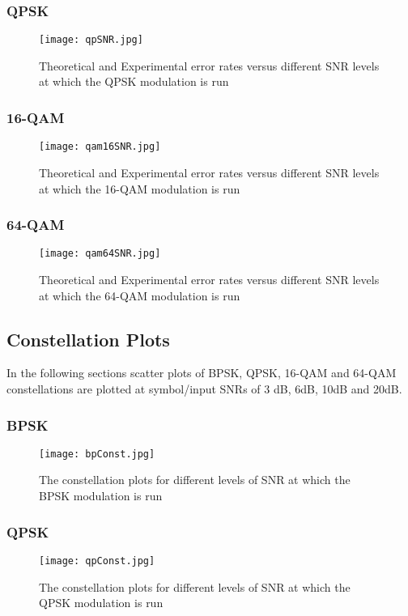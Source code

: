 \documentclass[]{article}
\begin{document}
\subsubsection{QPSK}
\begin{figure}[H]
\centering
\hspace*{-2cm}\texttt{[image: qpSNR.jpg]}
\caption{Theoretical and Experimental error rates versus different SNR levels at which the QPSK modulation is run }
\end{figure}
\subsubsection{16-QAM}
\begin{figure}[H]
\centering
\hspace*{-2cm}\texttt{[image: qam16SNR.jpg]}
\caption{Theoretical and Experimental error rates versus different SNR levels at which the 16-QAM modulation is run }
\end{figure}
\subsubsection{64-QAM}
\begin{figure}[H]
\centering
\hspace*{-2cm}\texttt{[image: qam64SNR.jpg]}
\caption{Theoretical and Experimental error rates versus different SNR levels at which the 64-QAM modulation is run }
\end{figure}
\subsection{Constellation Plots}
In the following sections scatter plots of BPSK, QPSK, 16-QAM and 64-QAM constellations are plotted at symbol/input SNRs of 3 dB, 6dB, 10dB and 20dB.

\subsubsection{BPSK}
\begin{figure}[H]
\centering
\hspace*{-2cm}\texttt{[image: bpConst.jpg]}
\caption{The constellation plots for different levels of SNR at which the BPSK modulation is run }
\end{figure}
\subsubsection{QPSK}
\begin{figure}[H]
\centering
\hspace*{-2cm}\texttt{[image: qpConst.jpg]}
\caption{The constellation plots for different levels of SNR at which the QPSK modulation is run}
\end{figure}
\end{document}
